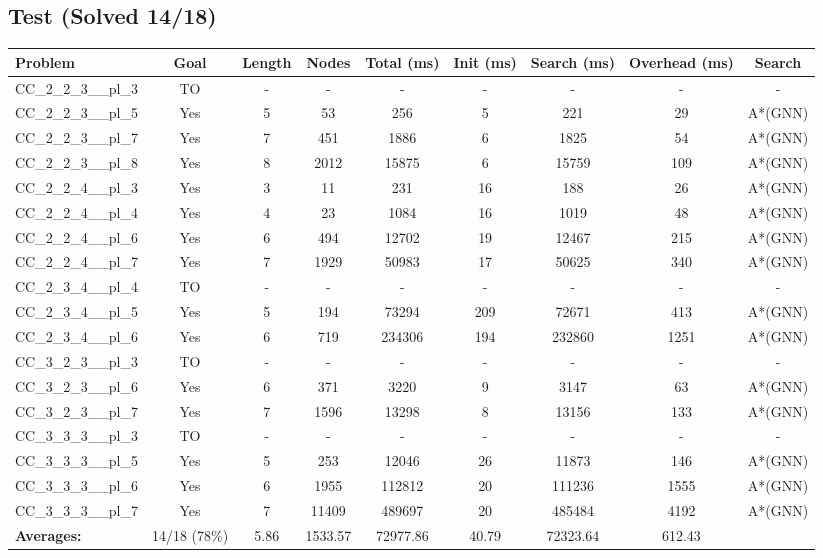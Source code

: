 \documentclass{article}
\begin{document}
\subsection*{Test (Solved 14/18)}
\begin{tabular}{lcccccccc}
\toprule
Problem & Goal & Length & Nodes & Total (ms) & Init (ms) & Search (ms) & Overhead (ms) & Search \\
\midrule
CC\_2\_2\_3\_\_pl\_3 & TO & - & - & - & - & - & - & - \\
CC\_2\_2\_3\_\_pl\_5 & Yes & 5 & 53 & 256 & 5 & 221 & 29 & A*(GNN) \\
CC\_2\_2\_3\_\_pl\_7 & Yes & 7 & 451 & 1886 & 6 & 1825 & 54 & A*(GNN) \\
CC\_2\_2\_3\_\_pl\_8 & Yes & 8 & 2012 & 15875 & 6 & 15759 & 109 & A*(GNN) \\
CC\_2\_2\_4\_\_pl\_3 & Yes & 3 & 11 & 231 & 16 & 188 & 26 & A*(GNN) \\
CC\_2\_2\_4\_\_pl\_4 & Yes & 4 & 23 & 1084 & 16 & 1019 & 48 & A*(GNN) \\
CC\_2\_2\_4\_\_pl\_6 & Yes & 6 & 494 & 12702 & 19 & 12467 & 215 & A*(GNN) \\
CC\_2\_2\_4\_\_pl\_7 & Yes & 7 & 1929 & 50983 & 17 & 50625 & 340 & A*(GNN) \\
CC\_2\_3\_4\_\_pl\_4 & TO & - & - & - & - & - & - & - \\
CC\_2\_3\_4\_\_pl\_5 & Yes & 5 & 194 & 73294 & 209 & 72671 & 413 & A*(GNN) \\
CC\_2\_3\_4\_\_pl\_6 & Yes & 6 & 719 & 234306 & 194 & 232860 & 1251 & A*(GNN) \\
CC\_3\_2\_3\_\_pl\_3 & TO & - & - & - & - & - & - & - \\
CC\_3\_2\_3\_\_pl\_6 & Yes & 6 & 371 & 3220 & 9 & 3147 & 63 & A*(GNN) \\
CC\_3\_2\_3\_\_pl\_7 & Yes & 7 & 1596 & 13298 & 8 & 13156 & 133 & A*(GNN) \\
CC\_3\_3\_3\_\_pl\_3 & TO & - & - & - & - & - & - & - \\
CC\_3\_3\_3\_\_pl\_5 & Yes & 5 & 253 & 12046 & 26 & 11873 & 146 & A*(GNN) \\
CC\_3\_3\_3\_\_pl\_6 & Yes & 6 & 1955 & 112812 & 20 & 111236 & 1555 & A*(GNN) \\
CC\_3\_3\_3\_\_pl\_7 & Yes & 7 & 11409 & 489697 & 20 & 485484 & 4192 & A*(GNN) \\
\textbf{Averages:} & 14/18 (78\%) & 5.86 & 1533.57 & 72977.86 & 40.79 & 72323.64 & 612.43 & \\
\bottomrule
\end{tabular}
\\[0.7cm]
\end{document}
